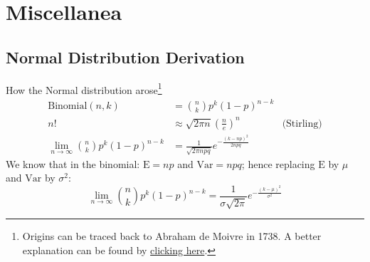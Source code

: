 
\section*{Miscellanea}
\subsection*{Normal Distribution Derivation}
\begin{frame}[plain, noframenumbering, label=appendixnormal]{How the Normal
        distribution arose\footnote{Origins can be traced back to
            Abraham de Moivre in 1738.
            A better explanation can be found by
            \href{http://www.stat.yale.edu/~pollard/Courses/241.fall2014/notes2014/Bin.Normal.pdf}{clicking here}.}}
    $$
        \begin{aligned}
            \text{Binomial}(n, k)                            & = \binom{n}{k} p^k (1-p)^{n-k}                                                \\
            n!                                               & \approx \sqrt{2 \pi n} \left(\frac{n}{e}\right)^n         & \text{(Stirling)} \\
            \lim_{n \to \infty} \binom{n}{k} p^k (1-p)^{n-k} & = \frac{1}{\sqrt{2 \pi npq}} e^{-\frac{(k - np)^2}{2npq}}
        \end{aligned}
    $$
    We know that in the binomial: $\mathrm{E} = np$ and $\mathrm{Var} = npq$; hence replacing $\mathrm{E}$ by $\mu$ and $\mathrm{Var}$ by $\sigma^2$:
    $$\lim_{n \to \infty} \binom{n}{k} p^k (1-p)^{n-k} = \frac{1}{\sigma \sqrt{2 \pi}} e^{-\frac{(k - \mu)^2}{\sigma^2}}$$
\end{frame}
